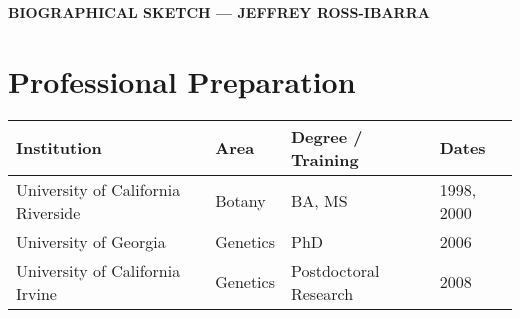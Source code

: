 \documentclass[11pt]{article}
\begin{document}
\begin{center}
	\begin{Large}
		\sf\textbf{\uppercase{Biographical Sketch --- Jeffrey Ross-Ibarra}}
	\end{Large}
\end{center}



\section{Professional Preparation}

\begin{tabular}{l l l l}
Institution    \hspace{52mm}              &   Area  \hspace{10mm}     & Degree / Training  \hspace{13mm}    & Dates \\
\hline
University of California Riverside & Botany & BA, MS & 1998, 2000 \\
University of Georgia & Genetics & PhD & 2006\\
University of California Irvine & Genetics & Postdoctoral Research & 2008 \\
\hline 
\end{tabular}
\end{document}
